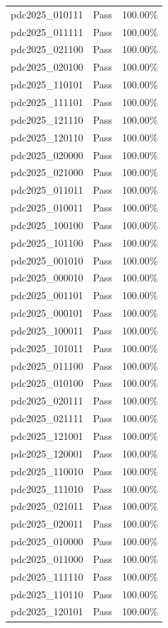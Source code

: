 \begin{table}[ht]
\begin{tabular}{llr}
pdc2025_010111 & Pass & 100.00\% \\
pdc2025_011111 & Pass & 100.00\% \\
pdc2025_021100 & Pass & 100.00\% \\
pdc2025_020100 & Pass & 100.00\% \\
pdc2025_110101 & Pass & 100.00\% \\
pdc2025_111101 & Pass & 100.00\% \\
pdc2025_121110 & Pass & 100.00\% \\
pdc2025_120110 & Pass & 100.00\% \\
pdc2025_020000 & Pass & 100.00\% \\
pdc2025_021000 & Pass & 100.00\% \\
pdc2025_011011 & Pass & 100.00\% \\
pdc2025_010011 & Pass & 100.00\% \\
pdc2025_100100 & Pass & 100.00\% \\
pdc2025_101100 & Pass & 100.00\% \\
pdc2025_001010 & Pass & 100.00\% \\
pdc2025_000010 & Pass & 100.00\% \\
pdc2025_001101 & Pass & 100.00\% \\
pdc2025_000101 & Pass & 100.00\% \\
pdc2025_100011 & Pass & 100.00\% \\
pdc2025_101011 & Pass & 100.00\% \\
pdc2025_011100 & Pass & 100.00\% \\
pdc2025_010100 & Pass & 100.00\% \\
pdc2025_020111 & Pass & 100.00\% \\
pdc2025_021111 & Pass & 100.00\% \\
pdc2025_121001 & Pass & 100.00\% \\
pdc2025_120001 & Pass & 100.00\% \\
pdc2025_110010 & Pass & 100.00\% \\
pdc2025_111010 & Pass & 100.00\% \\
pdc2025_021011 & Pass & 100.00\% \\
pdc2025_020011 & Pass & 100.00\% \\
pdc2025_010000 & Pass & 100.00\% \\
pdc2025_011000 & Pass & 100.00\% \\
pdc2025_111110 & Pass & 100.00\% \\
pdc2025_110110 & Pass & 100.00\% \\
pdc2025_120101 & Pass & 100.00\% \\

\end{tabular}
\end{table}
